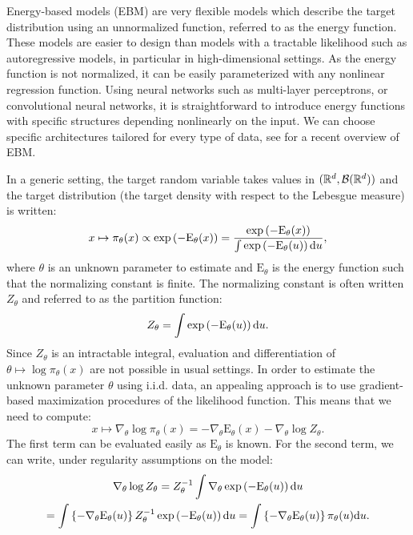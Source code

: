 \documentclass[english,graybox,envcountchap,envcountsame,sectrefs,shortlabels]{svmono}
\theoremstyle{style}
\begin{document}
\begin{example}
Energy-based models (EBM) are very flexible models which describe the target distribution using an unnormalized function, referred to as the energy function. These models are easier to design than models with a tractable likelihood such as autoregressive models, in particular in high-dimensional settings. As the energy function is not normalized, it can
be easily parameterized with any nonlinear regression function. Using neural networks such as multi-layer perceptrons, or convolutional neural networks,  it is straightforward to introduce energy functions with specific structures depending nonlinearly on the input. We can choose specific architectures tailored for every type of data, see \cite{song2021train} for a recent overview of EBM.

In a generic setting, the target random variable takes values in $(\mathbb{R}^d,\mathcal{B}(\mathbb{R}^d))$ and the target distribution (the target density with respect to the Lebesgue measure) is written:
$$
x\mapsto \pi_\theta(x) \propto \exp\left(-\mathrm{E}_\theta(x)\right) = \frac{\exp\left(-\mathrm{E}_\theta(x)\right)}{\int \exp\left(-\mathrm{E}_\theta(u)\right)\mathrm{d} u},
$$
where $\theta$ is an unknown parameter to estimate and $\mathrm{E}_\theta$ is the energy function such that the normalizing constant is finite. The normalizing constant is often written $Z_\theta$ and referred to as the partition function:
$$
Z_\theta = \int \exp\left(-\mathrm{E}_\theta(u)\right)\mathrm{d} u.
$$
Since $Z_\theta$ is an intractable integral, evaluation and
differentiation of $\theta\mapsto \log \pi_\theta(x)$ are not possible in usual settings. In order to estimate the unknown parameter $\theta$ using i.i.d. data, an appealing approach is to use gradient-based maximization procedures of the likelihood function. This means that we need to compute:
$$
x\mapsto \nabla_\theta \log\pi_\theta(x) = -\nabla_\theta\mathrm{E}_\theta(x) - \nabla_\theta \log Z_\theta.
$$
The first term can be evaluated easily as $\mathrm{E}_\theta$ is known. For the second term, we can write, under regularity assumptions on the model:
\begin{multline*}
\nabla_\theta \log Z_\theta = Z_\theta^{-1} \int \nabla_\theta\exp\left(-\mathrm{E}_\theta(u)\right)\mathrm{d} u \\=  \int \left\{-\nabla_\theta \mathrm{E}_\theta(u)\right\}Z_\theta^{-1}\exp\left(-\mathrm{E}_\theta(u)\right)\mathrm{d} u = \int \left\{-\nabla_\theta \mathrm{E}_\theta(u)\right\}\pi_\theta(u)\mathrm{d} u .
\end{multline*}

\end{example}
\end{document}
